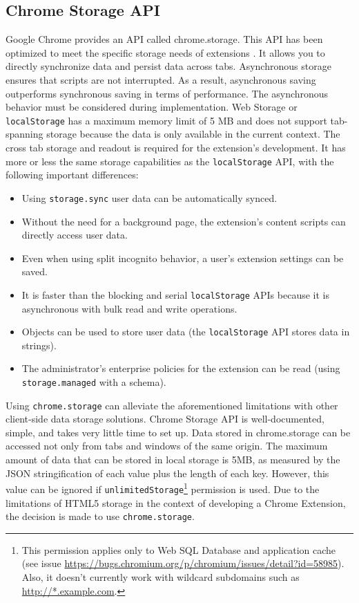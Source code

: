 \subsection*{Chrome Storage API}
Google Chrome provides an API called chrome.storage. This API has been optimized to meet the specific storage needs of extensions \autocite{chrome2021storage}. It allows you to directly synchronize data and persist data across tabs. Asynchronous storage ensures that scripts are not interrupted. As a result, asynchronous saving outperforms synchronous saving in terms of performance. The asynchronous behavior must be considered during implementation. Web Storage or \texttt{localStorage} has a maximum memory limit of 5 MB and does not support tab-spanning storage because the data is only available in the current context. The cross tab storage and readout is required for the extension's development. It has more or less the same storage capabilities as the \texttt{localStorage} API, with the following important differences:

\begin{itemize}
  \item Using \texttt{storage.sync} user data can be automatically synced.
  \item Without the need for a background page, the extension's content scripts can directly access user data.
  \item Even when using split incognito behavior, a user's extension settings can be saved.
  \item It is faster than the blocking and serial \texttt{localStorage} APIs because it is asynchronous with bulk read and write operations.
  \item Objects can be used to store user data (the \texttt{localStorage} API stores data in strings).
  \item The administrator's enterprise policies for the extension can be read (using \texttt{storage.managed} with a schema).
\end{itemize}

Using \texttt{chrome.storage} can alleviate the aforementioned limitations with other client-side data storage solutions. Chrome Storage API is well-documented, simple, and takes very little time to set up. Data stored in chrome.storage can be accessed not only from tabs and windows of the same origin. The maximum amount of data that can be stored in local storage is 5MB, as measured by the JSON stringification of each value plus the length of each key. However, this value can be ignored if \texttt{unlimitedStorage}\footnote{This permission applies only to Web SQL Database and application cache (see issue \url{https://bugs.chromium.org/p/chromium/issues/detail?id=58985}). Also, it doesn't currently work with wildcard subdomains such as \url{http://*.example.com}.} permission is used. Due to the limitations of HTML5 storage in the context of developing a Chrome Extension, the decision is made to use \texttt{chrome.storage}.
